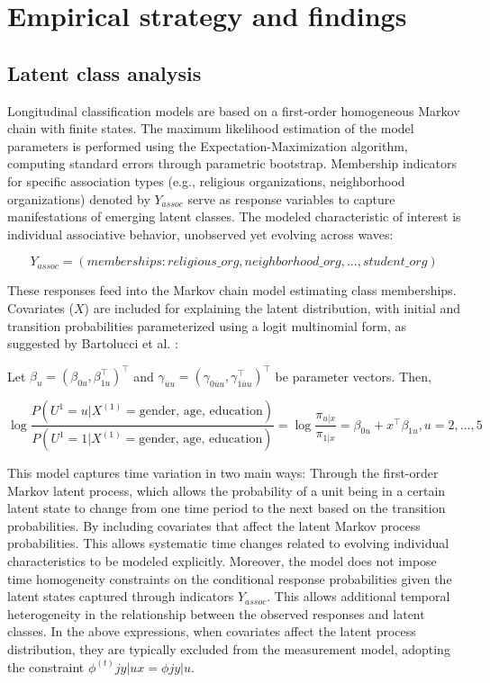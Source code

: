 \section{Empirical strategy and findings}

\subsection{Latent class analysis}

Longitudinal classification models are based on a first-order homogeneous Markov chain with finite states. The maximum likelihood estimation of the model parameters is performed using the Expectation-Maximization algorithm, computing standard errors through parametric bootstrap. Membership indicators for specific association types (e.g., religious organizations, neighborhood organizations) denoted by $Y_{assoc}$ serve as response variables to capture manifestations of emerging latent classes. The modeled characteristic of interest is individual associative behavior, unobserved yet evolving across waves:

\begin{equation}
Y_{assoc}= (memberships: religious\_org, neighborhood\_org, ..., student\_org)
\end{equation}

These responses feed into the Markov chain model estimating class memberships. Covariates ($X$) are included for explaining the latent distribution, with initial and transition probabilities parameterized using a logit multinomial form, as suggested by Bartolucci et al. \parencite{bartolucci_latent_2009}:

Let $\beta_u = (\beta_{0u}, \beta^\top_{1u})^\top$ and $\gamma_{\overline{u}u} = (\gamma_{0\overline{u}u}, \gamma^\top_{1\overline{u}u})^\top$ be parameter vectors. Then,

\begin{equation}
\log\frac{P(U^{1}=u|X^{(1)}=\text{gender, age, education})}{P(U^{1}=1|X^{(1)}=\text{gender, age, education})}= \log\frac{\pi_{u|x}}{\pi_{1|x}}=\beta_{0u}+x^{\top}\beta_{1u}, u=2,...,5
\end{equation}

This model captures time variation in two main ways: Through the first-order Markov latent process, which allows the probability of a unit being in a certain latent state to change from one time period to the next based on the transition probabilities.  By including covariates that affect the latent Markov process probabilities. This allows systematic time changes related to evolving individual characteristics to be modeled explicitly. Moreover, the model does not impose time homogeneity constraints on the conditional response probabilities given the latent states captured through indicators $Y_{assoc}$. This allows additional temporal heterogeneity in the relationship between the observed responses and latent classes. In the above expressions, when covariates affect the latent process distribution, they are typically excluded from the measurement model, adopting the constraint $\phi^{(t)}{jy|ux}=\phi{jy|u}$.
\bigskip

